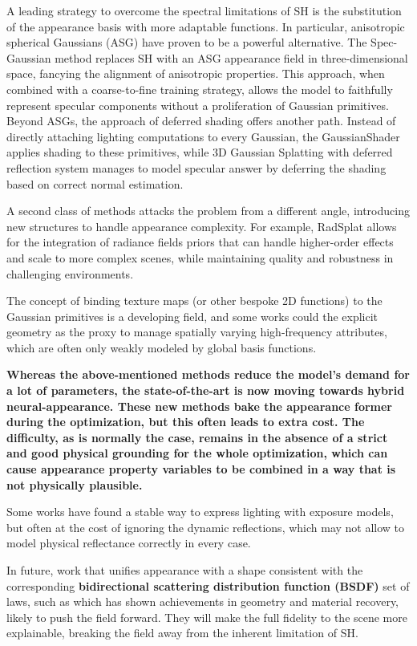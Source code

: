 \documentclass[11pt,a4paper]{article}
\begin{document}
A leading strategy to overcome the spectral limitations of SH is the substitution of the appearance basis with more adaptable functions. In particular, anisotropic spherical Gaussians (ASG) have proven to be a powerful alternative. The Spec-Gaussian method \cite{arxiv:2402.15870v1} replaces SH with an ASG appearance field in three-dimensional space, fancying the alignment of anisotropic properties. This approach, when combined with a coarse-to-fine training strategy, allows the model to faithfully represent specular components without a proliferation of Gaussian primitives. Beyond ASGs, the approach of deferred shading offers another path. Instead of directly attaching lighting computations to every Gaussian, the GaussianShader \cite{arxiv:2311.17977v1} applies shading to these primitives, while 3D Gaussian Splatting with deferred reflection system manages to model specular answer \cite{arxiv:2404.18454v2} by deferring the shading based on correct normal estimation.

A second class of methods attacks the problem from a different angle, introducing new structures to handle appearance complexity. For example, RadSplat \cite{arxiv:2403.13806v1} allows for the integration of radiance fields priors that can handle higher-order effects and scale to more complex scenes, while maintaining quality and robustness in challenging environments.

The concept of binding texture maps (or other bespoke 2D functions) to the Gaussian primitives is a developing field, and some works could the explicit geometry as the proxy to manage spatially varying high-frequency attributes, which are often only weakly modeled by global basis functions.

\textbf{Whereas the above-mentioned methods reduce the model's demand for a lot of parameters, the state-of-the-art is now moving towards hybrid neural-appearance. These new methods bake the appearance former during the optimization, but this often leads to extra cost. The difficulty, as is normally the case, remains in the absence of a strict and good physical grounding for the whole optimization, which can cause appearance property variables to be combined in a way that is not physically plausible.}

Some works have found a stable way to express lighting with exposure models, but often at the cost of ignoring the dynamic reflections, which may not allow to model physical reflectance correctly in every case.

In future, work that unifies appearance with a shape consistent with the corresponding \textbf{bidirectional scattering distribution function (BSDF)} set of laws, such as \cite{arxiv:2210.10210v2} which has shown achievements in geometry and material recovery, likely to push the field forward. They will make the full fidelity to the scene more explainable, breaking the field away from the inherent limitation of SH.
\end{document}
